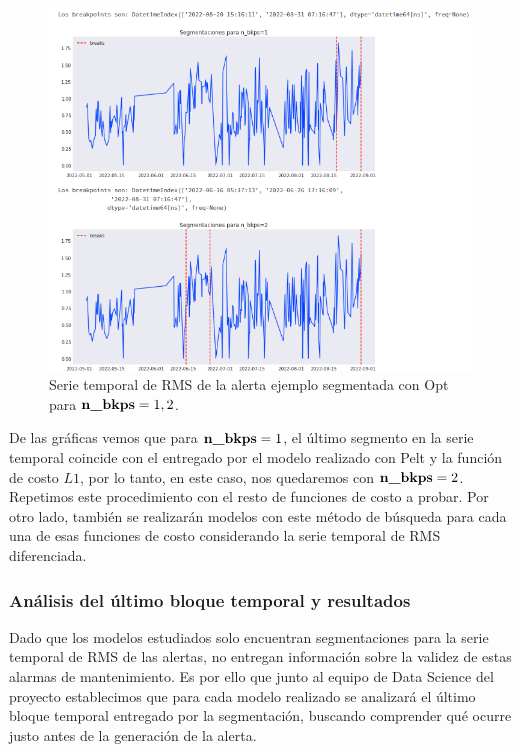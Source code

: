 \documentclass{article}[14pts]
\begin{document}
    \begin{center}
      \begin{figure}[h]
        \centering
        \includegraphics[width=.85\textwidth]{images/25.png}
        \caption{Serie temporal de RMS de la alerta ejemplo segmentada con Opt para $\text{\textbf{n\_bkps}}=1, 2$.}
      \end{figure}    
    \end{center}

    De las gráficas vemos que para $\text{\textbf{n\_bkps}}=1$, el último segmento en la serie temporal coincide con el entregado por el modelo realizado con Pelt y la función de costo $L1$, por lo tanto, en este caso, nos quedaremos con $\text{\textbf{n\_bkps}}=2$. Repetimos este procedimiento con el resto de funciones de costo a probar. Por otro lado, también se realizarán modelos con este método de búsqueda para cada una de esas funciones de costo considerando la serie temporal de RMS diferenciada.

    \subsubsection{Análisis del último bloque temporal y resultados}

    Dado que los modelos estudiados solo encuentran segmentaciones para la serie temporal de RMS de las alertas, no entregan información sobre la validez de estas alarmas de mantenimiento. Es por ello que junto al equipo de Data Science del proyecto establecimos que para cada modelo realizado se analizará el último bloque temporal entregado por la segmentación, buscando comprender qué ocurre justo antes de la generación de la alerta. 
\end{document}
